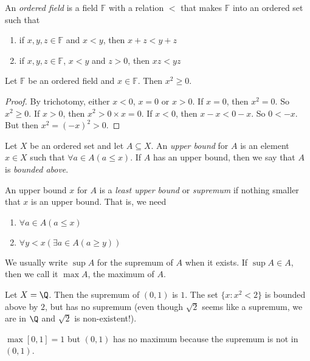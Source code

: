 \documentclass[a4paper]{article}
\begin{document}
\begin{defi}
  An \emph{ordered field} is a field $\mathbb{F}$ with a relation $<$ that makes $\mathbb{F}$ into an ordered set such that
  \begin{enumerate}
    \item if $x, y, z \in \mathbb{F}$ and $x < y$, then $x + z < y + z$
    \item if $x, y, z \in \mathbb{F}$, $x < y$ and $z > 0$, then $xz < yz$
  \end{enumerate}
\end{defi}

\begin{lemma}
  Let $\mathbb{F}$ be an ordered field and $x\in \mathbb{F}$. Then $x^2 \geq 0$.
\end{lemma}

\begin{proof}
  By trichotomy, either $x < 0$, $x = 0$ or $x > 0$. If $x = 0$, then $x^2 = 0$. So $x^2 \geq 0$. If $x > 0$, then $x^2 > 0\times x = 0$. If $x < 0$, then $x - x < 0 - x$. So $0 < -x$. But then $x^2 = (-x)^2 > 0$.
\end{proof}

\begin{defi}
  Let $X$ be an ordered set and let $A\subseteq X$. An \emph{upper bound} for $A$ is an element $x\in X$ such that $\forall a\in A(a \leq x)$. If $A$ has an upper bound, then we say that $A$ is \emph{bounded above}.

  An upper bound $x$ for $A$ is a \emph{least upper bound} or \emph{supremum} if nothing smaller that $x$ is an upper bound. That is, we need
  \begin{enumerate}
    \item $\forall a\in A(a \leq x)$
    \item $\forall y < x(\exists a\in A(a \geq y))$
  \end{enumerate}

  We usually write $\sup A$ for the supremum of $A$ when it exists. If $\sup A\in A$, then we call it $\max A$, the maximum of $A$.
\end{defi}

\begin{eg}
  Let $X = \Q$. Then the supremum of $(0, 1)$ is $1$. The set $\{x: x^2 < 2\}$ is bounded above by $2$, but has no supremum (even though $\sqrt{2}$ seems like a supremum, we are in $\Q$ and $\sqrt{2}$ is non-existent!).

  $\max [0, 1] = 1$ but $(0, 1)$ has no maximum because the supremum is not in $(0, 1)$.
\end{eg}
\end{document}
